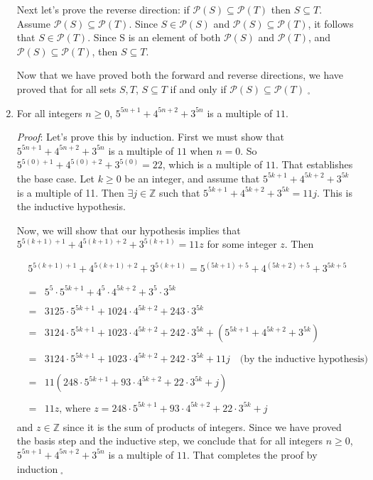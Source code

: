 \documentclass[12pt]{amsart}
\theoremstyle{definition}
\theoremstyle{remark}
\newcommand{\ints}{\mathbb Z}
\newcommand{\powerset}{\mathscr P}
\begin{document}
\begin{enumerate}
Next let's prove the reverse direction: if $\powerset{(S)}\subseteq \powerset{(T)}$ then $S\subseteq T$.
Assume $\powerset{(S)}\subseteq \powerset{(T)}$. 
Since $S\in \powerset{(S)}$ and $\powerset{(S)}\subseteq \powerset{(T)}$, it follows that $S\in \powerset{(T)}$.
Since S is an element of both $\powerset{(S)}$ and $\powerset{(T)}$, and $\powerset{(S)}\subseteq \powerset{(T)}$, then $S\subseteq T$.

Now that we have proved both the forward and reverse directions, we have proved that for all sets $S,T$, $S\subseteq T$ if and only if $\powerset{(S)}\subseteq \powerset{(T)}$$\;_{\square}$\\

\newpage


\item For all integers $n\geq 0$, $5^{5n+1}+4^{5n+2}+3^{5n}$ is a multiple of $11$.


\bigskip
\bigskip

\emph{Proof}: Let's prove this by induction. First we must show that $5^{5n+1}+4^{5n+2}+3^{5n}$ is a multiple of $11$ when $n=0$.
So $5^{5(0)+1}+4^{5(0)+2}+3^{5(0)}=22$, which is a multiple of $11$. That establishes the base case.
Let $k\geq 0$ be an integer, and assume that $5^{5k+1}+4^{5k+2}+3^{5k}$ is a multiple of 11. 
Then $\exists j\in\ints$ such that $5^{5k+1}+4^{5k+2}+3^{5k}=11j$. This is the inductive hypothesis.

Now, we will show that our hypothesis implies that $5^{5(k+1)+1}+4^{5(k+1)+2}+3^{5(k+1)}=11z$ for some integer $z$. Then

$$5^{5(k+1)+1}+4^{5(k+1)+2}+3^{5(k+1)} = 5^{(5k+1)+5}+4^{(5k+2)+5}+3^{5k+5}$$

\begin{eqnarray*}
    &=& 5^5\cdot 5^{5k+1}+4^5\cdot 4^{5k+2}+3^5\cdot 3^{5k} \\
    \\
    &=& 3125\cdot 5^{5k+1}+1024\cdot 4^{5k+2}+243\cdot 3^{5k} \\
    \\
    &=& 3124\cdot 5^{5k+1}+1023\cdot 4^{5k+2}+242\cdot 3^{5k}+(5^{5k+1}+4^{5k+2}+3^{5k}) \\
    \\
    &=& 3124\cdot 5^{5k+1}+1023\cdot 4^{5k+2}+242\cdot 3^{5k}+11j \hspace{1em} \mbox{(by the inductive hypothesis)} \\
    \\
    &=& 11(248\cdot 5^{5k+1}+93\cdot 4^{5k+2}+22\cdot 3^{5k}+j) \\
    \\
    &=& 11z \mbox{, where } z=248\cdot 5^{5k+1}+93\cdot 4^{5k+2}+22\cdot 3^{5k}+j\\
\end{eqnarray*}
and $z\in\ints$ since it is the sum of products of integers.
Since we have proved the basis step and the inductive step, we conclude that for all integers $n\geq 0$, $5^{5n+1}+4^{5n+2}+3^{5n}$ is a multiple of $11$. 
That completes the proof by induction$\;_{\square}$\\


\end{enumerate}
\end{document}

